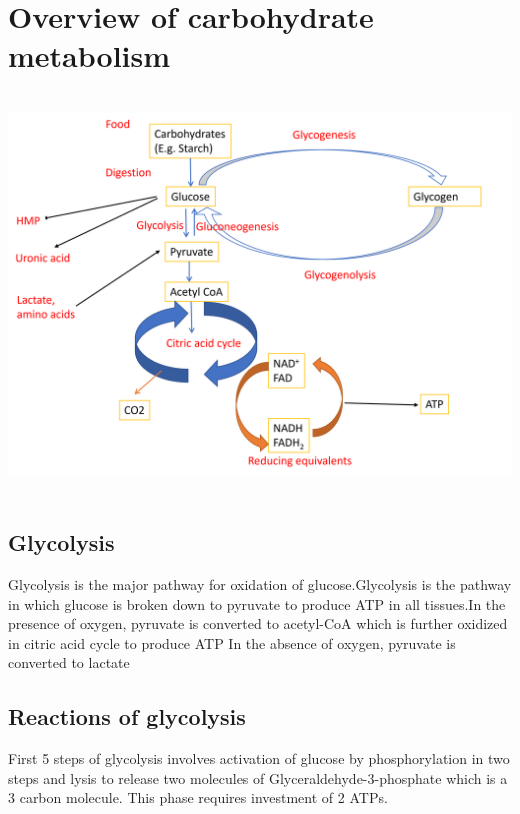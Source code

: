 \documentclass[
]{book}
\begin{document}
\section{Overview of carbohydrate metabolism}\label{overview-of-carbohydrate-metabolism}

\includegraphics[width=\textwidth,height=4.16667in]{Images/CarbMet.png}

\subsection{Glycolysis}\label{glycolysis-1}

Glycolysis is the major pathway for oxidation of glucose.Glycolysis is the pathway in which glucose is broken down to pyruvate to produce ATP in all tissues.In the presence of oxygen, pyruvate is converted to acetyl-CoA which is further oxidized in citric acid cycle to produce ATP In the absence of oxygen, pyruvate is converted to lactate

\subsection{Reactions of glycolysis}\label{reactions-of-glycolysis}

First 5 steps of glycolysis involves activation of glucose by phosphorylation in two steps and lysis to release two molecules of Glyceraldehyde-3-phosphate which is a 3 carbon molecule. This phase requires investment of 2 ATPs.
\end{document}
